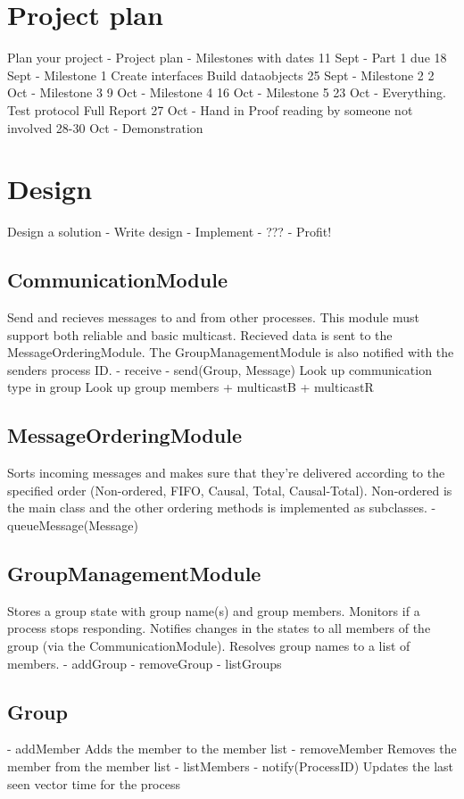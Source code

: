 \documentclass[11pt,swedish]{article}
\begin{document}
\section{Project plan}
Plan your project
- Project plan
- Milestones with dates
	11 Sept		- Part 1 due
	18 Sept		- Milestone 1
					Create interfaces
					Build dataobjects
	25 Sept		- Milestone 2
	2 Oct		- Milestone 3
	9 Oct		- Milestone 4
	16 Oct		- Milestone 5
	23 Oct		- Everything.
		Test protocol
		Full Report
	27 Oct 		- Hand in
		Proof reading by someone not involved
	28-30 Oct 	- Demonstration

\section{Design}
Design a solution
- Write design
- Implement
- ???
- Profit!


\subsection{CommunicationModule}
Send and recieves messages to and from other processes. This module must support both reliable and basic multicast. Recieved data is sent to the MessageOrderingModule. The GroupManagementModule is also notified with the senders process ID. 
- receive
- send(Group, Message)
	Look up communication type in group
	Look up group members
+ multicastB
+ multicastR


\subsection{MessageOrderingModule}
Sorts incoming messages and makes sure that they're delivered according to the specified order (Non-ordered, FIFO, Causal, Total, Causal-Total). Non-ordered is the main class and the other ordering methods is implemented as subclasses. 
- queueMessage(Message)


\subsection{GroupManagementModule}
Stores a group state with group name(s) and group members. Monitors if a process stops responding. Notifies changes in the states to all members of the group (via the CommunicationModule). Resolves group names to a list of members.
- addGroup
- removeGroup
- listGroups

\subsection{Group}
- addMember
	Adds the member to the member list
- removeMember
	Removes the member from the member list
- listMembers
- notify(ProcessID)
	Updates the last seen vector time for the process
\end{document}
